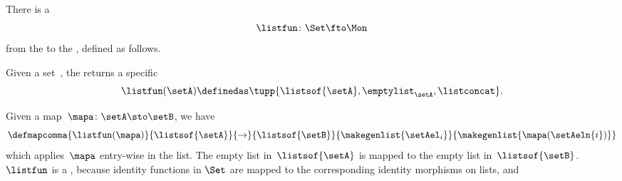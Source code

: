 \begin{example} There is a 
\begin{equation}\label{eq:list-functor-intro}
    \listfun\colon \Set \fto \Mon
\end{equation}
from the  to the , defined as follows.

Given a set~\setA, the  returns a specific 
\begin{equation}\label{eq:list-functor-on-objects}
    \listfun(\setA)\definedas\tupp{\listsof{\setA},\emptylist_\setA, \listconcat}.
\end{equation}

Given a map~$\mapa\colon \setA \sto \setB$, we have
\begin{equation}\label{eq:list-functor-on-morphisms}
    \defmapcomma{
        \listfun(\mapa)
    }{
        \listsof{\setA}
    }{
        \to
    }{
        \listsof{\setB}
    }{
        \makegenlist{ \setAel_i }
    }{
        \makegenlist{ \mapa(\setAeln{i}) }
    }
\end{equation}
which applies~$\mapa$ entry-wise in the list.
The empty list in~$\listsof{\setA}$ is mapped to the empty list in~$\listsof{\setB}$.
    {}
$\listfun$ is a , because identity functions in $\Set$ are mapped to the corresponding identity morphisms on lists, and 

\end{example}
